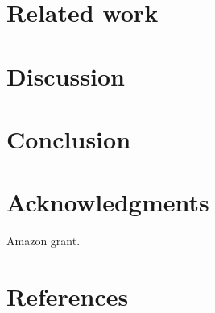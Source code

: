 \documentclass{article}
\begin{document}
\section{Related work}


\section{Discussion}

\section{Conclusion}

\section{Acknowledgments}

Amazon grant.


\section{References}


\end{document}
